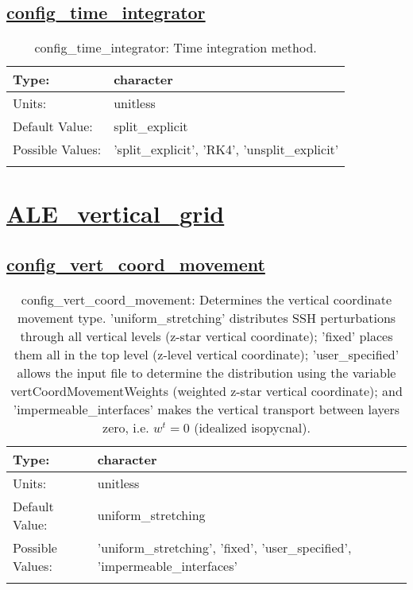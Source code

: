\subsection[config\_time\_integrator]{\hyperref[sec:nm_tab_time_integration]{config\_time\_integrator}}
\label{subsec:nm_sec_config_time_integrator}
\begin{center}
\begin{longtable}{| p{2.0in} || p{4.0in} |}
    \hline
    Type: & character \\
    \hline
    Units: & \si{unitless} \\
    \hline
    Default Value: & split\_explicit \\
    \hline
    Possible Values: & 'split\_explicit', 'RK4', 'unsplit\_explicit' \\
    \hline
    \caption{config\_time\_integrator: Time integration method.}
\end{longtable}
\end{center}
\section[ALE\_vertical\_grid]{\hyperref[sec:nm_tab_ALE_vertical_grid]{ALE\_vertical\_grid}}
\label{sec:nm_sec_ALE_vertical_grid}
\subsection[config\_vert\_coord\_movement]{\hyperref[sec:nm_tab_ALE_vertical_grid]{config\_vert\_coord\_movement}}
\label{subsec:nm_sec_config_vert_coord_movement}
\begin{center}
\begin{longtable}{| p{2.0in} || p{4.0in} |}
    \hline
    Type: & character \\
    \hline
    Units: & \si{unitless} \\
    \hline
    Default Value: & uniform\_stretching \\
    \hline
    Possible Values: & 'uniform\_stretching', 'fixed', 'user\_specified', 'impermeable\_interfaces' \\
    \hline
    \caption{config\_vert\_coord\_movement: Determines the vertical coordinate movement type. 'uniform\_stretching' distributes SSH perturbations through all vertical levels (z-star vertical coordinate); 'fixed' places them all in the top level (z-level vertical coordinate); 'user\_specified' allows the input file to determine the distribution using the variable vertCoordMovementWeights (weighted z-star vertical coordinate); and 'impermeable\_interfaces' makes the vertical transport between layers zero, i.e. $w^t=0$ (idealized isopycnal).}
\end{longtable}
\end{center}
